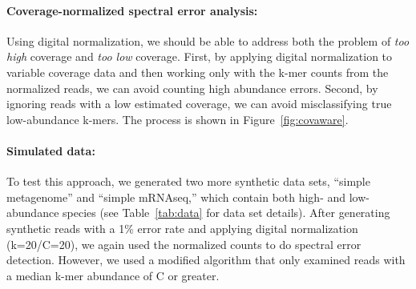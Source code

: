 \documentclass{article}
\begin{document}
\paragraph{Coverage-normalized spectral error analysis:}

Using digital normalization, we should be able to address both the
problem of {\em too high} coverage and {\em too low} coverage.
First, by applying digital normalization to variable
coverage data and then working only with the k-mer counts from the
normalized reads, we can avoid counting high abundance errors.
Second, by ignoring reads with a low estimated coverage, we can
avoid misclassifying true low-abundance k-mers.  The process
is shown in  Figure~\ref{fig:covaware}.


\paragraph{Simulated data:}
To test this approach, we generated two more synthetic data sets,
``simple metagenome'' and ``simple mRNAseq,'' which contain both high-
and low-abundance species (see Table~\ref{tab:data} for data set
details).  After generating synthetic reads with a 1\% error rate and
applying digital normalization (k=20/C=20), we again used the normalized
counts to do spectral error detection.  However, we used a modified
algorithm that only examined reads with a median k-mer abundance of C
or greater.

\end{document}
